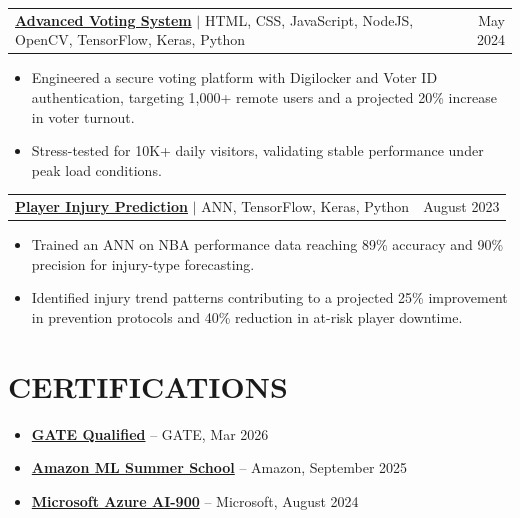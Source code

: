 \documentclass[11pt,letterpaper]{article}
\makeatletter
\newcommand{\entry}[3]{%
  \vspace{4pt}
  \noindent
  \begin{tabular*}{\textwidth}{@{}l@{\extracolsep{\fill}}r@{}}
    \textbf{#1} $|$ {\small #2} & {\small #3}
  \end{tabular*}%
  \vspace{-2pt}
}
\makeatother
\begin{document}
\entry{\href{http://advance-digilocker.onrender.com}{Advanced Voting System}}{HTML, CSS, JavaScript, NodeJS, OpenCV, TensorFlow, Keras, Python}{May 2024}
\begin{itemize}
  \item Engineered a secure voting platform with Digilocker and Voter ID authentication, targeting 1,000+ remote users and a projected 20\% increase in voter turnout.
  \item Stress-tested for 10K+ daily visitors, validating stable performance under peak load conditions.
\end{itemize}

\entry{\href{https://github.com/Subhronilmukhopadhyay/Player-injury-prediction-and-perforamance-analysis}{Player Injury Prediction}}{ANN, TensorFlow, Keras, Python}{August 2023}
\begin{itemize}
  \item Trained an ANN on NBA performance data reaching 89\% accuracy and 90\% precision for injury-type forecasting.
  \item Identified injury trend patterns contributing to a projected 25\% improvement in prevention protocols and 40\% reduction in at-risk player downtime.
\end{itemize}

\section{CERTIFICATIONS}
\begin{itemize}[leftmargin=0.05in, label={}, itemsep=1pt, topsep=2pt]
  \item \textbf{\href{https://drive.google.com/file/d/1rdAsCMI72mAHT7p3uxmYyhaJ3Ay7M6PS/view?usp=sharing}{GATE Qualified}} -- GATE, Mar 2026
  \item \textbf{\href{https://drive.google.com/file/d/1Kf243vsauPNtK6LypOj2DxtP6L0LJwem/view?usp=sharing}{Amazon ML Summer School}} -- Amazon, September 2025
  \item \textbf{\href{https://www.certiport.com/portal/Pages/PrintTranscriptInfo.aspx?action=Cert&id=455&cvid=e/DjBvrCw80fhcKK1WkhBQ==}{Microsoft Azure AI-900}} -- Microsoft, August 2024
\end{itemize}
\end{document}
